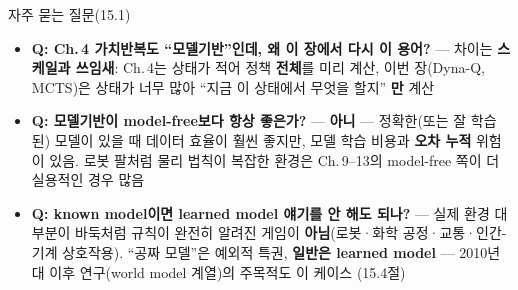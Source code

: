 \documentclass[aspectratio=169,11pt]{beamer}
\begin{document}
\begin{frame}{자주 묻는 질문(15.1)}
  \small
  \begin{itemize}
    \item \textbf{Q: Ch.\,4 가치반복도 ``모델기반''인데, 왜 이 장에서
      다시 이 용어?} --- 차이는 \textbf{스케일과 쓰임새}: Ch.\,4는
      상태가 적어 정책 \textbf{전체}를 미리 계산, 이번 장(Dyna-Q,
      MCTS)은 상태가 너무 많아 ``지금 이 상태에서 무엇을 할지''
      \textbf{만} 계산
    \item \textbf{Q: 모델기반이 model-free보다 항상 좋은가?} ---
      \textbf{아니} --- 정확한(또는 잘 학습된) 모델이 있을 때 데이터
      효율이 훨씬 좋지만, 모델 학습 비용과 \textbf{오차 누적} 위험이
      있음. 로봇 팔처럼 물리 법칙이 복잡한 환경은 Ch.\,9--13의
      model-free 쪽이 더 실용적인 경우 많음
    \item \textbf{Q: known model이면 learned model 얘기를 안 해도
      되나?} --- 실제 환경 대부분이 바둑처럼 규칙이 완전히 알려진
      게임이 \textbf{아님}(로봇·화학 공정·교통·인간-기계 상호작용).
      ``공짜 모델''은 예외적 특권, \textbf{일반은 learned model} ---
      2010년대 이후 연구(world model 계열)의 주목적도 이 케이스
      (15.4절)
  \end{itemize}
\end{frame}

\end{document}
